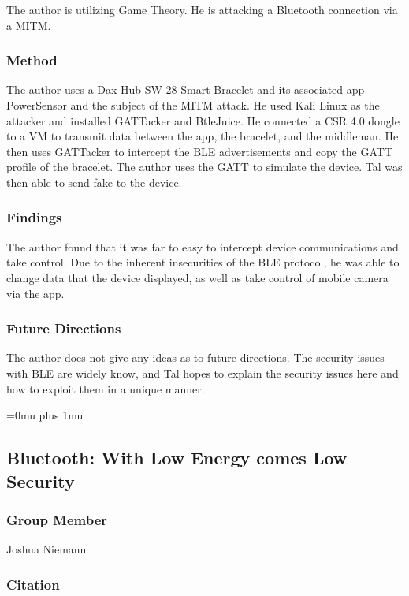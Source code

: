 \noindent
The author is utilizing Game Theory. He is attacking a Bluetooth connection via a MITM. 

\subsubsection{Method}

\noindent
The author uses a Dax-Hub SW-28 Smart Bracelet and its associated app PowerSensor and the subject of the MITM attack. He used Kali Linux as the attacker and installed GATTacker and BtleJuice. He connected a CSR 4.0 dongle to a VM to transmit data between the app, the bracelet, and the middleman. He then uses GATTacker to intercept the BLE advertisements and copy the GATT profile of the bracelet. The author uses the GATT to simulate the device. Tal was then able to send fake to the device. 

\subsubsection{Findings}

\noindent
The author found that it was far to easy to intercept device communications and take control. Due to the inherent insecurities of the BLE protocol, he was able to change data that the device displayed, as well as take control of mobile camera via the app. 

\subsubsection{Future Directions}

\noindent
The author does not give any ideas as to future directions. The security issues with BLE are widely know, and Tal hopes to explain the security issues here and how to exploit them in a unique manner. 

\Urlmuskip=0mu plus 1mu\relax

\noindent
\subsection{{B}luetooth: {W}ith {L}ow {E}nergy comes {L}ow {S}ecurity}

\subsubsection{Group Member}

\noindent
Joshua Niemann

\noindent
\subsubsection{Citation}

